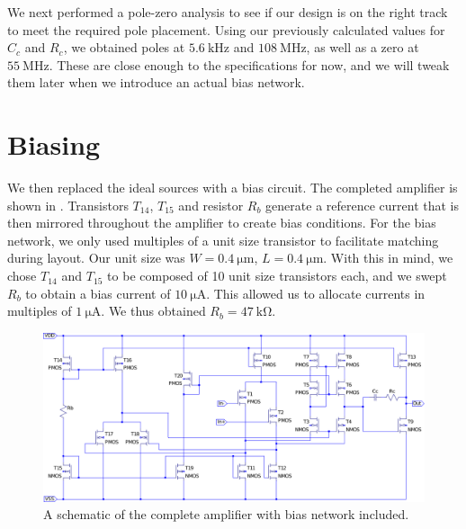 \documentclass[journal,hidelinks]{IEEEtran}
\begin{document}
\begin{table}[!htb]
  \centering
  \caption{Bias currents obtained after a first order simulation of the amplifier.}
  \label{tab:bias-first-order}
\end{table}

We next performed a pole-zero analysis to see if our design is on the right track to meet the required pole placement. Using our previously calculated values for $C_c$ and $R_c$, we obtained poles at $\SI{5.6}{\kilo\hertz}$ and $\SI{108}{\mega\hertz}$, as well as a zero at $\SI{55}{\mega\hertz}$. These are close enough to the specifications for now, and we will tweak them later when we introduce an actual bias network.

\section{Biasing}

We then replaced the ideal sources with a bias circuit. The completed amplifier is shown in . Transistors $T_{14}$, $T_{15}$ and resistor $R_b$ generate a reference current that is then mirrored throughout the amplifier to create bias conditions. For the bias network, we only used multiples of a unit size transistor to facilitate matching during layout. Our unit size was $W = \SI{0.4}{\micro\meter}$, $L = \SI{0.4}{\micro\meter}$. With this in mind, we chose $T_{14}$ and $T_{15}$ to be composed of 10 unit size transistors each, and we swept $R_b$ to obtain a bias current of $\SI{10}{\micro\ampere}$. This allowed us to allocate currents in multiples of $\SI{1}{\micro\ampere}$. We thus obtained $R_b = \SI{47}{\kilo\ohm}$.

\begin{figure}[!htb]
  \centering
  \includegraphics[width=\textwidth]{schematics/amplifier.pdf}
  \caption{A schematic of the complete amplifier with bias network included.}
  \label{fig:amplifier}
\end{figure}
\end{document}

